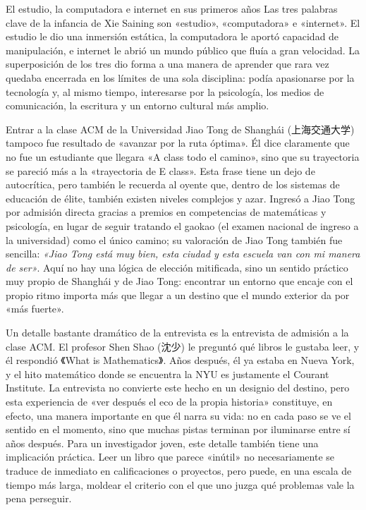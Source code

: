\documentclass[a4paper,12pt]{article}
\begin{document}
\begin{knowledgebox}{El estudio, la computadora e internet en sus primeros años}
Las tres palabras clave de la infancia de Xie Saining son «estudio», «computadora» e «internet». El estudio le dio una inmersión estática, la computadora le aportó capacidad de manipulación, e internet le abrió un mundo público que fluía a gran velocidad. La superposición de los tres dio forma a una manera de aprender que rara vez quedaba encerrada en los límites de una sola disciplina: podía apasionarse por la tecnología y, al mismo tiempo, interesarse por la psicología, los medios de comunicación, la escritura y un entorno cultural más amplio.
\end{knowledgebox}

Entrar a la clase ACM de la Universidad Jiao Tong de Shanghái (上海交通大学) tampoco fue resultado de «avanzar por la ruta óptima». Él dice claramente que no fue un estudiante que llegara «A class todo el camino», sino que su trayectoria se pareció más a la «trayectoria de E class». Esta frase tiene un dejo de autocrítica, pero también le recuerda al oyente que, dentro de los sistemas de educación de élite, también existen niveles complejos y azar. Ingresó a Jiao Tong por admisión directa gracias a premios en competencias de matemáticas y psicología, en lugar de seguir tratando el gaokao (el examen nacional de ingreso a la universidad) como el único camino; su valoración de Jiao Tong también fue sencilla: \textit{«Jiao Tong está muy bien, esta ciudad y esta escuela van con mi manera de ser»}. Aquí no hay una lógica de elección mitificada, sino un sentido práctico muy propio de Shanghái y de Jiao Tong: encontrar un entorno que encaje con el propio ritmo importa más que llegar a un destino que el mundo exterior da por «más fuerte».

Un detalle bastante dramático de la entrevista es la entrevista de admisión a la clase ACM. El profesor Shen Shao (沈少) le preguntó qué libros le gustaba leer, y él respondió 《What is Mathematics》. Años después, él ya estaba en Nueva York, y el hito matemático donde se encuentra la NYU es justamente el Courant Institute. La entrevista no convierte este hecho en un designio del destino, pero esta experiencia de «ver después el eco de la propia historia» constituye, en efecto, una manera importante en que él narra su vida: no en cada paso se ve el sentido en el momento, sino que muchas pistas terminan por iluminarse entre sí años después. Para un investigador joven, este detalle también tiene una implicación práctica. Leer un libro que parece «inútil» no necesariamente se traduce de inmediato en calificaciones o proyectos, pero puede, en una escala de tiempo más larga, moldear el criterio con el que uno juzga qué problemas vale la pena perseguir.
\end{document}
